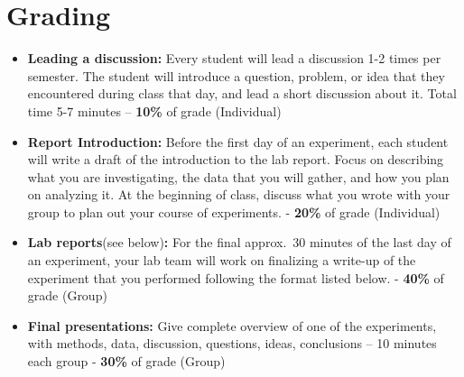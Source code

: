 \section*{Grading}
\begin{itemize}
\item \textbf{Leading a discussion:} Every student will lead a discussion 1-2 times per semester. The student will introduce a question, problem, or idea that they encountered during class that day, and lead a short discussion about it. Total time 5-7 minutes – \textbf{10\%} of grade (Individual)
\item \textbf{Report Introduction:} Before the first day of an experiment, each student will write a draft of the introduction to the lab report. Focus on describing what you are investigating, the data that you will gather, and how you plan on analyzing it. At the beginning of class, discuss what you wrote with your group to plan out your course of experiments. - \textbf{20\%} of grade (Individual)
\item \textbf{Lab reports}(see below)\textbf{:} For the final approx.\ 30 minutes of the last day of an experiment, your lab team will work on finalizing a write-up of the experiment that you performed following the format listed below. - \textbf{40\%} of grade (Group)
\item \textbf{Final presentations:} Give complete overview of one of the experiments, with methods, data, discussion, questions, ideas, conclusions – 10 minutes each group - \textbf{30\%} of grade (Group)
\end{itemize}

\newpage

